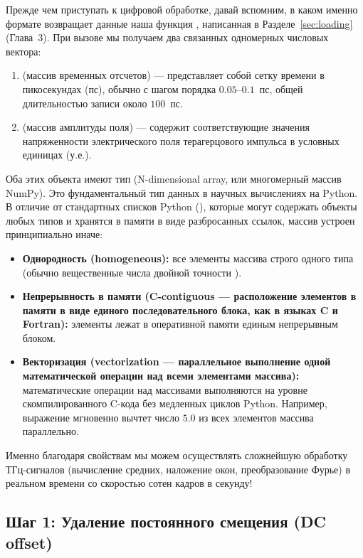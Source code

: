 Прежде чем приступать к цифровой обработке, давай вспомним, в каком именно формате возвращает данные наша функция , написанная в Разделе~\ref{sec:loading} (Глава~3). При вызове  мы получаем два связанных одномерных числовых вектора:
\begin{enumerate}
    \item {} (массив временных отсчетов) — представляет собой сетку времени в пикосекундах ($\text{пс}$), обычно с шагом порядка $0.05$--$0.1$~пс, общей длительностью записи около $100$~пс.
    \item {} (массив амплитуды поля) — содержит соответствующие значения напряженности электрического поля терагерцового импульса в условных единицах (у.е.).
\end{enumerate}

Оба этих объекта имеют тип  (N-dimensional array, или многомерный массив NumPy). Это фундаментальный тип данных в научных вычислениях на Python. В отличие от стандартных списков Python (), которые могут содержать объекты любых типов и хранятся в памяти в виде разбросанных ссылок, массив  устроен принципиально иначе:
\begin{itemize}
    \item \textbf{Однородность (homogeneous):} все элементы массива строго одного типа (обычно вещественные числа двойной точности ).
    \item \textbf{Непрерывность в памяти (C-contiguous --- расположение элементов в памяти в виде единого последовательного блока, как в языках C и Fortran):} элементы лежат в оперативной памяти единым непрерывным блоком.
    \item \textbf{Векторизация (vectorization --- параллельное выполнение одной математической операции над всеми элементами массива):} математические операции над массивами выполняются на уровне скомпилированного C-кода без медленных циклов Python. Например, выражение  мгновенно вычтет число $5.0$ из всех элементов массива параллельно.
\end{itemize}

Именно благодаря свойствам  мы можем осуществлять сложнейшую обработку ТГц-сигналов (вычисление средних, наложение окон, преобразование Фурье) в реальном времени со скоростью сотен кадров в секунду!

\subsection{Шаг 1: Удаление постоянного смещения (DC offset)}

